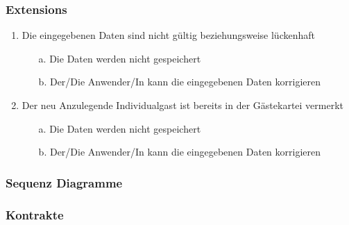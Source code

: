 \documentclass[./detailed_overview_usecases.tex]{subfiles}
\begin{document}
    \subsubsection*{Extensions}
    \begin{enumerate}
        \item Die eingegebenen Daten sind nicht gültig beziehungsweise lückenhaft
        \begin{itemize}
                       \item[a.] Die Daten werden nicht gespeichert
                       \item[b.] Der/Die Anwender/In kann die eingegebenen Daten korrigieren
        \end{itemize}
        \item Der neu Anzulegende Individualgast ist bereits in der Gästekartei vermerkt
        \begin{itemize}
            \item[a.] Die Daten werden nicht gespeichert
            \item[b.] Der/Die Anwender/In kann die eingegebenen Daten korrigieren
        \end{itemize}
    \end{enumerate}

    \subsubsection{Sequenz Diagramme}
    \subsubsection{Kontrakte}
\end{document}
